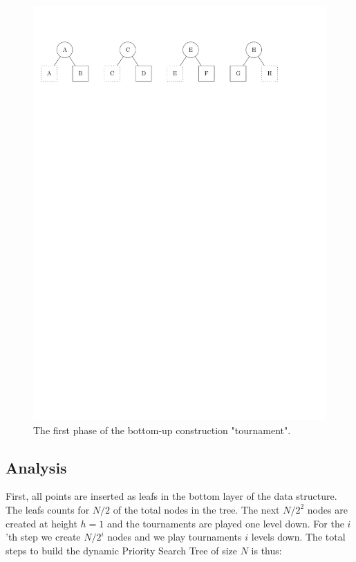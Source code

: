 \documentclass[twoside,11pt,openright]{report}
\begin{document}
\begin{figure}[h]
	\centering
	\includegraphics[scale=0.68]{../figures/internal_pst_dynamic_construction}
	\caption{The first phase of the bottom-up construction "tournament".}
	\label{fig:dynamic_pst_construction}
\end{figure}

\subsection*{Analysis}
First, all points are inserted as leafs in the bottom layer of the data structure. The leafs counts for $N/2$ of the total nodes in the tree. The next $N/2^2$ nodes are created at height $h = 1$ and the tournaments are played one level down. For the $i$'th step we create $N/2^i$ nodes and we play tournaments $i$ levels down. The total steps to build the dynamic Priority Search Tree of size $N$ is thus:
\end{document}
